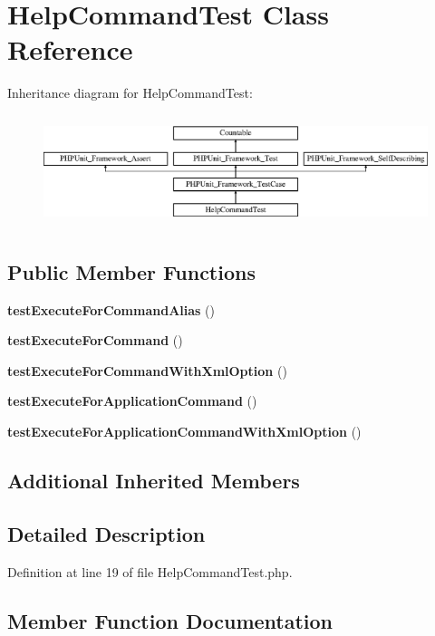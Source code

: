 \section{Help\+Command\+Test Class Reference}
\label{class_symfony_1_1_component_1_1_console_1_1_tests_1_1_command_1_1_help_command_test}
Inheritance diagram for Help\+Command\+Test\+:\begin{figure}[H]
\begin{center}
\leavevmode
\includegraphics[height=3.303835cm]{class_symfony_1_1_component_1_1_console_1_1_tests_1_1_command_1_1_help_command_test}
\end{center}
\end{figure}
\subsection*{Public Member Functions}
\begin{DoxyCompactItemize}
\item 
{\bf test\+Execute\+For\+Command\+Alias} ()
\item 
{\bf test\+Execute\+For\+Command} ()
\item 
{\bf test\+Execute\+For\+Command\+With\+Xml\+Option} ()
\item 
{\bf test\+Execute\+For\+Application\+Command} ()
\item 
{\bf test\+Execute\+For\+Application\+Command\+With\+Xml\+Option} ()
\end{DoxyCompactItemize}
\subsection*{Additional Inherited Members}


\subsection{Detailed Description}


Definition at line 19 of file Help\+Command\+Test.\+php.



\subsection{Member Function Documentation}
